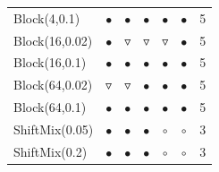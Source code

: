 \begin{ruledtabular}
\begin{tabular}{lcccccc}
Block(4,0.1) & $\bullet$ & $\bullet$ & $\bullet$ & $\bullet$ & $\bullet$ & 5\\
Block(16,0.02) & $\bullet$ & $\triangledown$ & $\triangledown$ & $\triangledown$ & $\bullet$ & 5\\
Block(16,0.1) & $\bullet$ & $\bullet$ & $\bullet$ & $\bullet$ & $\bullet$ & 5\\
Block(64,0.02) & $\triangledown$ & $\triangledown$ & $\bullet$ & $\bullet$ & $\bullet$ & 5\\
Block(64,0.1) & $\bullet$ & $\bullet$ & $\bullet$ & $\bullet$ & $\bullet$ & 5\\
ShiftMix(0.05) & $\bullet$ & $\bullet$ & $\bullet$ & $\circ$ & $\circ$ & 3\\
ShiftMix(0.2) & $\bullet$ & $\bullet$ & $\bullet$ & $\circ$ & $\circ$ & 3\\
\end{tabular}
\end{ruledtabular}